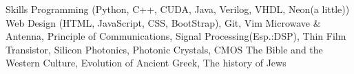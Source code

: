 
\begin{rubric}{Skills}
	\in*{}
		Programming (Python, C++, CUDA, Java, Verilog, VHDL, Neon(a little))
	\in{}
		Web Design (HTML, JavaScript, CSS, BootStrap), Git, Vim
	\in{}
		Microwave \& Antenna, Principle of Communications, Signal Processing(Esp.:DSP), Thin Film Transistor, Silicon Photonics, Photonic Crystals, CMOS
	\in{}
		The Bible and the Western Culture, Evolution of Ancient Greek, The history of Jews



\end{rubric}
